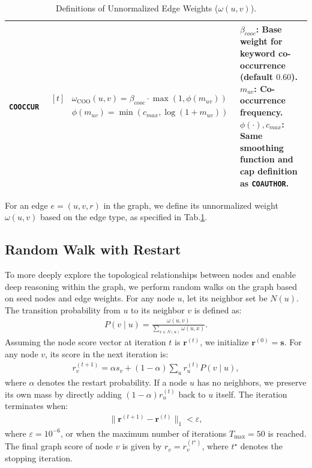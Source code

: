 \documentclass{llmxive}
\begin{document}
\begin{table}[!t]
\begin{tabular}{@{} l| p{6cm} p{7cm} @{}}
\midrule
\texttt{COOCCUR} & 
$\begin{aligned}[t]
&\omega_{\text{COO}}(u,v) = \beta_{cooc} \cdot \max(1, \phi(m_{uv})) \\
&\phi(m_{uv}) = \min(c_{max}, \log(1+m_{uv}))
\end{aligned}$ & 
$\beta_{cooc}$: Base weight for keyword co-occurrence (default $0.60$). \newline
$m_{uv}$: Co-occurrence frequency. \newline
$\phi(\cdot), c_{max}$: Same smoothing function and cap definition as \texttt{COAUTHOR}. \\
\bottomrule
\end{tabular}
\label{tab:edge_weight}
\caption{Definitions of Unnormalized Edge Weights ($\omega(u,v)$).}
\end{table}

 For an edge $e = (u, v, r)$ in the graph, we define its unnormalized weight $\omega(u,v)$ based on the edge type, as specified in Tab.\ref{tab:edge_weight}.

\subsection{Random Walk with Restart}
To more deeply explore the topological relationships between nodes and enable deep reasoning within the graph, we perform random walks on the graph based on seed nodes and edge weights.
For any node $u$, let its neighbor set be $N(u)$. The transition probability from $u$ to its neighbor $v$ is defined as:
\begin{align}
    P(v \mid u) = \frac{\omega(u,v)}{\sum_{x \in N(u)} \omega(u,x)}.
\end{align}
Assuming the node score vector at iteration $t$ is $\mathbf{r}^{(t)}$, we initialize $\mathbf{r}^{(0)}=\mathbf{s}$.
For any node $v$, its score in the next iteration is:
\begin{align}
    r_v^{(t+1)} = \alpha s_v + (1-\alpha) \sum_{u} r_u^{(t)} P(v \mid u),
\end{align}
where $\alpha$ denotes the restart probability.
If a node $u$ has no neighbors, we preserve its own mass by directly adding $(1-\alpha)r_u^{(t)}$ back to $u$ itself.
The iteration terminates when:
\begin{align}
    \|\mathbf{r}^{(t+1)} - \mathbf{r}^{(t)}\|_1 < \varepsilon,
\end{align}
where $\varepsilon = 10^{-6}$, or when the maximum number of iterations $T_{\max} = 50$ is reached.
The final graph score of node $v$ is given by $r_v = r_v^{(t^\star)}$, where $t^\star$ denotes the stopping iteration.
\end{document}

